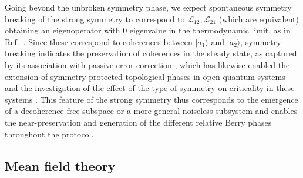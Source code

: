 \documentclass[11pt]{article}
\begin{document}
Going beyond the unbroken symmetry phase, we expect spontaneous symmetry breaking of the strong symmetry to correspond to $\mathcal{L}_{12},\mathcal{L}_{21}$ (which are equivalent) obtaining an eigenoperator with 0 eigenvalue in the thermodynamic limit, as in Ref.~\cite{Lieu2020}. Since these correspond to coherences between $|a_1\rangle$ and $|a_2\rangle$, symmetry breaking indicates the preservation of coherences in the steady state, as captured by its association with passive error correction \cite{Lieu2020,Liu2023}, which has likewise enabled the extension of symmetry protected topological phases in open quantum systems \cite{deGroot2022} and the investigation of the effect of the type of symmetry on criticality in these systems \cite{Minganti2023}. This feature of the strong symmetry thus corresponds to the emergence of a decoherence free subspace or a more general noiseless subsystem \cite{Lidar1998, Knill2000, Albert2014, Lieu2020} and enables the near-preservation and generation of the different relative Berry phases throughout the protocol. 


\subsection{Mean field theory}
\end{document}
